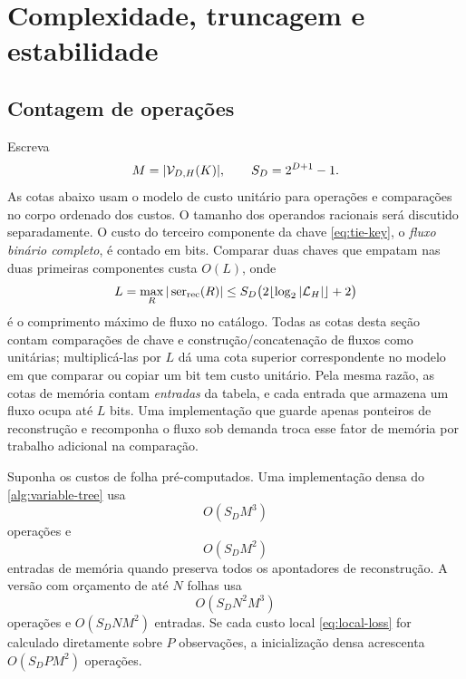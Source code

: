 \section{Complexidade, truncagem e estabilidade}
\label{sec:complexity-dp}

\subsection{Contagem de operações}

Escreva
\[
 M=|\mathcal{V}_{D,H}(K)|,\qquad S_D=2^{D+1}-1.
\]
As cotas abaixo usam o modelo de custo unitário para operações e comparações
no corpo ordenado dos custos. O tamanho dos operandos racionais será discutido
separadamente. O custo do terceiro componente da chave \eqref{eq:tie-key}, o
\emph{fluxo binário completo}, é contado em bits. Comparar duas
chaves que empatam nas duas primeiras componentes custa
$O(L)$, onde
\begin{equation}
 L=\max_R|\operatorname{ser}_{\rm rec}(R)|
 \le S_D\bigl(2\lfloor\log_2|\mathcal{L}_H|\rfloor+2\bigr)
 \label{eq:stream-length}
\end{equation}
é o comprimento máximo de fluxo no catálogo. Todas as cotas desta seção contam
comparações de chave e construção/concatenação de fluxos como unitárias;
multiplicá-las por $L$ dá uma cota superior correspondente no modelo em que
comparar ou copiar um bit tem custo unitário.
Pela mesma razão, as cotas de memória contam \emph{entradas} da tabela, e cada
entrada que armazena um fluxo ocupa até $L$ bits. Uma implementação que
guarde apenas ponteiros de reconstrução e recomponha o fluxo sob demanda
troca esse fator de memória por trabalho adicional na comparação.

\begin{theorem}
\label{thm:state-complexity}
Suponha os custos de folha pré-computados. Uma implementação densa do
\cref{alg:variable-tree} usa
\begin{equation}
 O(S_DM^3)
 \label{eq:dense-time}
\end{equation}
operações e
\begin{equation}
 O(S_DM^2)
 \label{eq:dense-memory}
\end{equation}
entradas de memória quando preserva todos os apontadores de reconstrução.
A versão com orçamento de até $N$ folhas usa
\begin{equation}
 O(S_DN^2M^3)
 \label{eq:budget-time}
\end{equation}
operações e $O(S_DNM^2)$ entradas. Se cada custo local
\eqref{eq:local-loss} for calculado diretamente sobre $P$ observações, a
inicialização densa acrescenta $O(S_DPM^2)$ operações.
\end{theorem}

